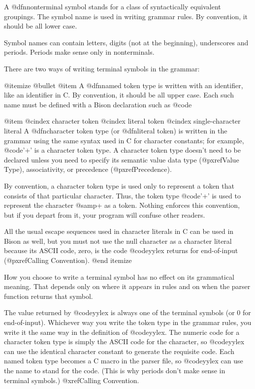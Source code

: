 {{{{{{{{{{{{{{{{{A @dfn{nonterminal symbol} stands for a class of syntactically equivalent
groupings.  The symbol name is used in writing grammar rules.  By convention,
it should be all lower case.

Symbol names can contain letters, digits (not at the beginning),
underscores and periods.  Periods make sense only in nonterminals.

There are two ways of writing terminal symbols in the grammar:

@itemize @bullet
@item
A @dfn{named token type} is written with an identifier, like an
identifier in C.  By convention, it should be all upper case.  Each
such name must be defined with a Bison declaration such as
@code{%

@item
@cindex character token
@cindex literal token
@cindex single-character literal
A @dfn{character token type} (or @dfn{literal token}) is written in
the grammar using the same syntax used in C for character constants;
for example, @code{'+'} is a character token type.  A character token
type doesn't need to be declared unless you need to specify its
semantic value data type (@pxref{Value Type}), associativity, or
precedence (@pxref{Precedence}).

By convention, a character token type is used only to represent a
token that consists of that particular character.  Thus, the token
type @code{'+'} is used to represent the character @samp{+} as a
token.  Nothing enforces this convention, but if you depart from it,
your program will confuse other readers.

All the usual escape sequences used in character literals in C can be
used in Bison as well, but you must not use the null character as a
character literal because its ASCII code, zero, is the code
@code{yylex} returns for end-of-input (@pxref{Calling Convention}).
@end itemize

How you choose to write a terminal symbol has no effect on its
grammatical meaning.  That depends only on where it appears in rules and
on when the parser function returns that symbol.

The value returned by @code{yylex} is always one of the terminal symbols
(or 0 for end-of-input).  Whichever way you write the token type in the
grammar rules, you write it the same way in the definition of @code{yylex}.
The numeric code for a character token type is simply the ASCII code for
the character, so @code{yylex} can use the identical character constant to
generate the requisite code.  Each named token type becomes a C macro in
the parser file, so @code{yylex} can use the name to stand for the code.
(This is why periods don't make sense in terminal symbols.)  @xref{Calling
Convention}.

}}}}}}}}}}}}}}}}}}
